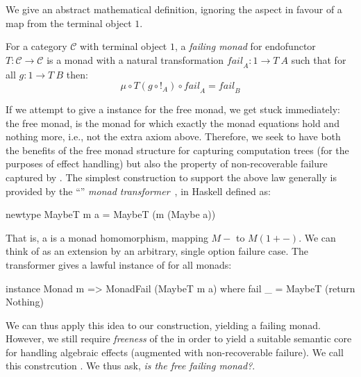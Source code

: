 \documentclass[preprint,sigplan]{acmart}
\begin{document}
We give an abstract mathematical definition,
ignoring the  aspect in favour of a map
from the terminal object $1$.
%
\begin{definition}
  For a category $\mathcal{C}$ with terminal object $1$,
  a \emph{failing monad} for endofunctor $T : \mathcal{C}
  \rightarrow \mathcal{C}$ is a monad with a natural transformation
  $\mathit{fail}_A : 1 \rightarrow T\ A$ such that for all $g : 1
\rightarrow T\ B$ then:
$$
\mu \circ T (g \circ !_A) \circ \mathit{fail}_A = \mathit{fail}_B
$$
\end{definition}
%
If we attempt to give a  instance for the free
monad, we get stuck immediately: the free monad, is the monad for
which exactly the monad equations hold and nothing more, i.e.,
not the extra  axiom above. Therefore, we seek
to have both the benefits of the free monad structure for
capturing computation trees (for the purposes of effect handling)
but also the property of non-recoverable failure captured
by . The simplest construction to support the
above law generally is provided by the ``''
\emph{monad transformer}~\cite{transformerpub},
in Haskell defined as:
%
\begin{haskell}
newtype MaybeT m a = MaybeT (m (Maybe a))
\end{haskell}
%
That is, a  is a monad homomorphism, mapping
$M -$ to $M (1 + -)$.
%
%
We can think of  as an extension by an arbitrary,
single option failure case. The  transformer
gives a lawful instance of  for all monads:
%
\begin{haskell}
  instance Monad m => MonadFail (MaybeT m a) where
    fail _ = MaybeT (return Nothing)
\end{haskell}
%
We can thus apply this idea to our  construction,
yielding a failing monad.
However, we still require \emph{freeness} of the  in order
to yield a suitable semantic core for handling algebraic effects
(augmented with non-recoverable failure). We call this constrcution . We thus ask,
\emph{is  the free failing monad?}.
\end{document}
